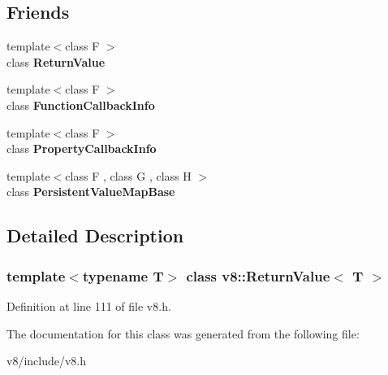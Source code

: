 \subsection*{Friends}
\begin{DoxyCompactItemize}
\item 
\mbox{\label{classv8_1_1ReturnValue_a53f604d3d6f2dc0647df33c9979f116a}} 
{\footnotesize template$<$class F $>$ }\\class {\bfseries Return\+Value}
\item 
\mbox{\label{classv8_1_1ReturnValue_a76786e6fa2d0eac5e2d4f647659d0d23}} 
{\footnotesize template$<$class F $>$ }\\class {\bfseries Function\+Callback\+Info}
\item 
\mbox{\label{classv8_1_1ReturnValue_a5018adab21fade2b42f4f60e45fa1083}} 
{\footnotesize template$<$class F $>$ }\\class {\bfseries Property\+Callback\+Info}
\item 
\mbox{\label{classv8_1_1ReturnValue_a08e2b8f164392d71811ce6cc134f33e3}} 
{\footnotesize template$<$class F , class G , class H $>$ }\\class {\bfseries Persistent\+Value\+Map\+Base}
\end{DoxyCompactItemize}


\subsection{Detailed Description}
\subsubsection*{template$<$typename T$>$\newline
class v8\+::\+Return\+Value$<$ T $>$}



Definition at line 111 of file v8.\+h.



The documentation for this class was generated from the following file\+:\begin{DoxyCompactItemize}
\item 
v8/include/v8.\+h\end{DoxyCompactItemize}
